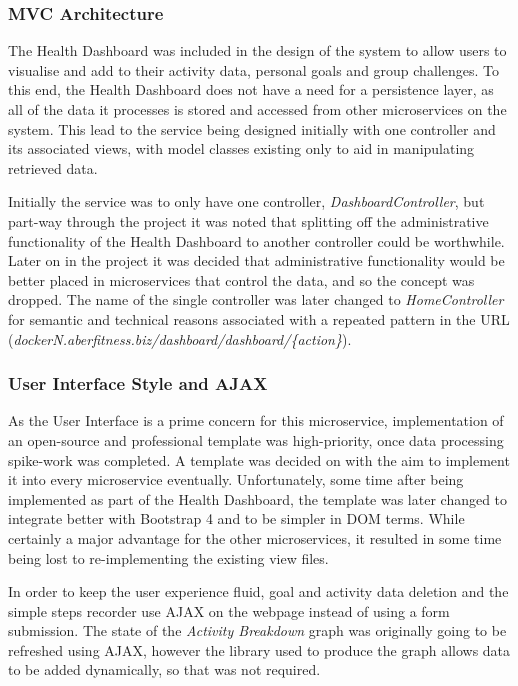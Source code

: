 \subsubsection{MVC Architecture}
\par
The Health Dashboard was included in the design of the system to allow users to visualise and add to their activity data, personal goals and group challenges. To this end, the Health Dashboard does not have a need for a persistence layer, as all of the data it processes is stored and accessed from other microservices on the system. This lead to the service being designed initially with one controller and its associated views, with model classes existing only to aid in manipulating retrieved data.

\par
Initially the service was to only have one controller, \textit{DashboardController}, but part-way through the project it was noted that splitting off the administrative functionality of the Health Dashboard to another controller could be worthwhile. Later on in the project it was decided that administrative functionality would be better placed in microservices that control the data, and so the concept was dropped. The name of the single controller was later changed to \textit{HomeController} for semantic and technical reasons associated with a repeated pattern in the URL (\textit{dockerN.aberfitness.biz/dashboard/dashboard/\{action\}}).

\subsubsection{User Interface Style and AJAX}
\par
As the User Interface is a prime concern for this microservice, implementation of an open-source and professional template was high-priority, once data processing spike-work was completed. A template was decided on with the aim to implement it into every microservice eventually. Unfortunately, some time after being implemented as part of the Health Dashboard, the template was later changed to integrate better with Bootstrap 4 and to be simpler in DOM terms. While certainly a major advantage for the other microservices, it resulted in some time being lost to re-implementing the existing view files.

\par
In order to keep the user experience fluid, goal and activity data deletion and the simple steps recorder use AJAX on the webpage instead of using a form submission. The state of the \textit{Activity Breakdown} graph was originally going to be refreshed using AJAX, however the library used to produce the graph allows data to be added dynamically, so that was not required.

